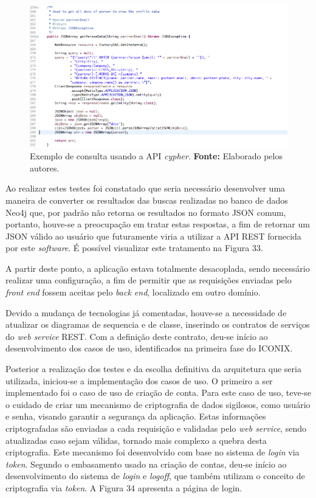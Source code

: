 \newpage 
\begin{figure}[h!]
	\centerline{\includegraphics[scale=0.45]{./imagens/query-cypher.png}}
	\caption[Exemplo de consulta usando a API \textit{cypher}]
	{Exemplo de consulta usando a API \textit{cypher}. \textbf{Fonte:} Elaborado pelos autores.}
	\label{fig:exemplo1}
\end{figure}

\par Ao realizar estes testes foi constatado que seria necessário desenvolver uma maneira de converter os resultados das buscas realizadas no banco de dados Neo4j que, por padrão não retorna os resultados no formato JSON comum, portanto, houve-se a preocupação em tratar estas respostas, a fim de retornar um JSON válido ao usuário que futuramente viria a utilizar a API REST fornecida por este \textit{software}. É possível visualizar este tratamento na Figura 33. 
 
\par A partir deste ponto, a aplicação estava totalmente desacoplada, sendo necessário realizar uma configuração, a fim de permitir que as requisições enviadas pelo \textit{front end} fossem aceitas pelo \textit{back end}, localizado em outro domínio.

\par Devido a mudança de tecnologias já comentadas, houve-se a necessidade de atualizar os diagramas de sequencia e de classe, inserindo os contratos de serviços do \textit{web service} REST. Com a definição deste contrato, deu-se início ao desenvolvimento dos casos de uso, identificados na primeira fase do ICONIX. 

\par Posterior a realização dos testes e da escolha definitiva da arquitetura que seria utilizada, iniciou-se a implementação dos casos de uso. O primeiro a ser implementado foi o caso de uso de criação de conta. Para este caso de uso, teve-se o cuidado de criar um mecanismo de criptografia de dados sigilosos, como usuário e senha, visando garantir a segurança da aplicação. Estas informações criptografadas são enviadas a cada requisição e validadas pelo \textit{web service}, sendo atualizadas caso sejam válidas, tornado mais complexo a quebra desta criptografia. Este mecanismo foi desenvolvido com base no sistema de \textit{login} via \textit{token}. Segundo o embasamento usado na criação de contas, deu-se início ao desenvolvimento do sistema de \textit{login} e \textit{logoff}, que também utilizam o conceito de criptografia via \textit{token}. A Figura 34 apresenta a página de login.

